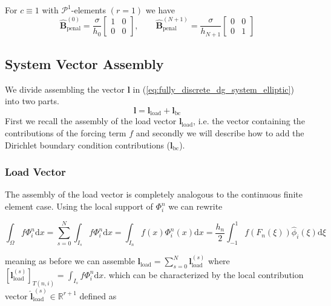 \begin{example}
    For $c\equiv 1$ with $\mathcal{P}^1$-elements $(r=1)$ we have 
    \begin{equation*}
        \widehat{\textbf{B}}_{\text{penal}}^{(0)} = \frac{\sigma}{h_0}
        \begin{bmatrix}
            1 & 0 \\
            0 & 0
        \end{bmatrix}
        ,\qquad 
        \widehat{\textbf{B}}_{\text{penal}}^{(N+1)} = \frac{\sigma}{h_{N+1}}
        \begin{bmatrix}
            0 & 0 \\
            0 & 1
        \end{bmatrix}
    \end{equation*}
\end{example}

\subsection{System Vector Assembly}
We divide assembling the vector \textbf{l} in (\ref{eq:fully_discrete_dg_system_elliptic}) into two parts.
\begin{equation*}
    \textbf{l} = \textbf{l}_{\text{load}} + \textbf{l}_{\text{bc}}
\end{equation*}
First we recall the assembly of the load vector $\textbf{l}_{\text{load}}$, i.e. the vector containing the contributions of the forcing term $f$
and secondly we will describe how to add the Dirichlet boundary condition contributions ($\textbf{l}_{\text{bc}}$).
\subsubsection{Load Vector}
The assembly of the load vector is completely analogous to the continuous finite element case.
Using the local support of $\Phi_i^n$ we can rewrite

\begin{equation*}
    \int_{\Omega} f \Phi_i^n \text{d}x = \sum_{s=0}^{N} \int_{I_s} f \Phi_i^n \text{d} x = \int_{I_n} f(x) \Phi_i^n(x) \text{d} x
    = \frac{h_n}{2} \int_{-1}^{1} f(F_n(\xi))\widehat{\phi}_i(\xi)\text{d}\xi
\end{equation*}

meaning as before we can assemble $\textbf{l}_{\text{load}} = \sum_{s=0}^{N} \textbf{l}_{\text{load}}^{(s)}$ where
$[\textbf{l}_{\text{load}}^{(s)}]_{T(n,i)} = \int_{I_s} f \Phi_i^n \text{d} x$.
which can be characterized by the local contribution vector $\widehat{\textbf{l}}_{\text{load}}^{\,(s)} \in \mathbb{R}^{r+1}$ defined as

